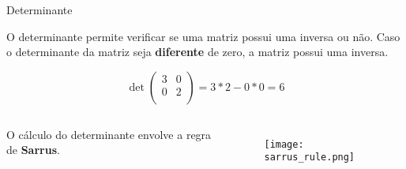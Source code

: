 \begin{frame}[t]{Determinante} 

    O determinante permite verificar se uma matriz possui uma inversa ou não. Caso o determinante da matriz seja \textbf{diferente} de zero, a matriz possui uma inversa.

    \vspace*{0.3cm}

    \begin{equation}
        \det\begin{pmatrix}
            3 & 0 \\
            0 & 2 \\
        \end{pmatrix}
        =
        3*2-0*0
        =
        6
    \end{equation}

    \vspace*{0.3cm}

    \begin{columns}[c]
        \hspace*{0.0cm}
        \centering
        O cálculo do determinante envolve a regra de \textbf{Sarrus}.
       \centering
       \begin{figure}
        \texttt{[image: sarrus\_rule.png]}
    \end{figure}
   \end{columns}
\end{frame}

